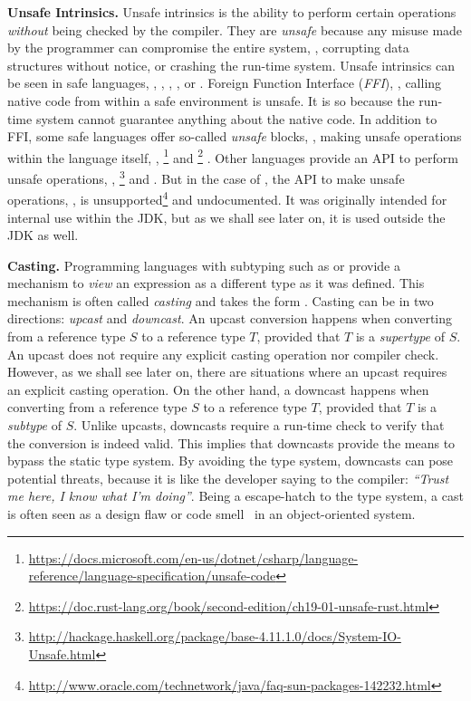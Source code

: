 \textbf{Unsafe Intrinsics.}
Unsafe intrinsics is the ability to perform certain operations \emph{without} being checked by the compiler.
They are \emph{unsafe} because any misuse made by the programmer can compromise the entire system, \eg{},
corrupting data structures without notice, or
crashing the run-time system.
Unsafe intrinsics can be seen in safe languages, \eg{},
,
,
, or
.
Foreign Function Interface (\emph{FFI}), \ie{}, calling native code from within a safe environment is unsafe.
It is so because the run-time system cannot guarantee anything about the native code.
In addition to FFI, some safe languages offer so-called \emph{unsafe} blocks, \ie{}, making unsafe operations within the language itself, \eg{},
\footnote{\url{https://docs.microsoft.com/en-us/dotnet/csharp/language-reference/language-specification/unsafe-code}}
and
\footnote{\url{https://doc.rust-lang.org/book/second-edition/ch19-01-unsafe-rust.html}}
.
Other languages provide an API to perform unsafe operations, \eg{},
\footnote{\url{http://hackage.haskell.org/package/base-4.11.1.0/docs/System-IO-Unsafe.html}}
and
.
But in the case of , the API to make unsafe operations,
,
is unsupported\footnote{\url{http://www.oracle.com/technetwork/java/faq-sun-packages-142232.html}}
and undocumented.
It was originally intended for internal use within the JDK, but as we shall see later on, it is used outside the JDK as well.

\textbf{Casting.}
Programming languages with subtyping such as \java{} or \cpp{} provide a mechanism to \emph{view} an expression as a different type as it was defined.
This mechanism is often called \emph{casting} and takes the form .
Casting can be in two directions: \emph{upcast} and \emph{downcast}.
An upcast conversion happens when converting from a reference type $S$ to a reference type $T$, provided that $T$ is a \emph{supertype} of $S$.
An upcast does not require any explicit casting operation nor compiler check.
However, as we shall see later on, there are situations where an upcast requires an explicit casting operation.
On the other hand, a downcast happens when converting from a reference type $S$ to a reference type $T$, provided that $T$ is a \emph{subtype} of $S$.
Unlike upcasts, downcasts require a run-time check to verify that the conversion is indeed valid.
This implies that downcasts provide the means to bypass the static type system.
By avoiding the type system, downcasts can pose potential threats, because it is like the developer saying to the compiler: \emph{``Trust me here, I know what I'm doing''}.
Being a escape-hatch to the type system,
a cast is often seen as a design flaw or code smell~\citep{tufanoWhenWhyYour2015} in an object-oriented system.


